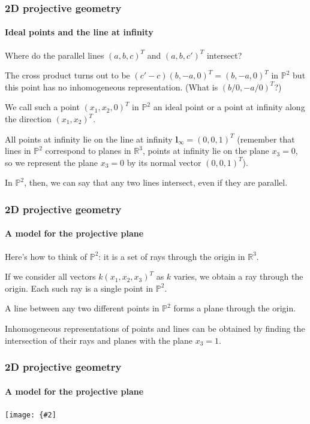 \documentclass[aspectratio=169]{beamer}
\renewcommand{\vec}[1]{\boldsymbol{#1}}
\def\Rset{\mathbb{R}}
\def\Pset{\mathbb{P}}
\newcommand{\myfig}[3]{\centerline{\texttt{[image: \{\#2]}}}
\begin{document}
\begin{frame}
\frametitle{2D projective geometry}
\framesubtitle{Ideal points and the line at infinity}

Where do the parallel lines $(a,b,c)^T$ and $(a,b,c')^T$ intersect?

\medskip

The cross product turns out to be $(c'-c)(b,-a,0)^T = (b,-a,0)^T$ in
$\Pset^2$ but this point has no inhomogeneous representation. (What is
$(b/0,-a/0)^T$?)

\medskip

We call such a point $(x_1,x_2,0)^T$ in $\Pset^2$ an \alert{ideal
point} or a \alert{point at infinity} along the direction
$(x_1,x_2)^T$.

\medskip

All points at infinity lie on the \alert{line at infinity}
$\vec{l}_{\infty} = (0,0,1)^T$ (remember that lines in $\Pset^2$
correspond to planes in $\Rset^3$, points at infinity lie on the plane
$x_3=0$, so we represent the plane $x_3=0$ by its normal vector
$(0,0,1)^T$).

\medskip

In $\Pset^2$, then, we can say that any two lines intersect, even if
they are parallel.

\end{frame}

\begin{frame}
\frametitle{2D projective geometry}
\framesubtitle{A model for the projective plane}

Here's how to think of $\Pset^2$: it is a \alert{set of rays}
through the origin in $\Rset^3$.

\medskip

If we consider all vectors $k(x_1,x_2,x_3)^T$ as $k$ varies, we obtain
a ray through the origin.  Each such ray is a \alert{single point} in
$\Pset^2$.

\medskip

A \alert{line} between any two different points in $\Pset^2$ forms a
\alert{plane through the origin}.

\medskip

Inhomogeneous representations of points and lines can be obtained by
finding the intersection of their rays and planes with the plane
$x_3=1$.

\end{frame}

\begin{frame}
\frametitle{2D projective geometry}
\framesubtitle{A model for the projective plane}

\myfig{3in}{HZ-fig1-1}{Hartley and Zisserman (2004), Fig.\ 2.1}

\end{frame}
\end{document}
